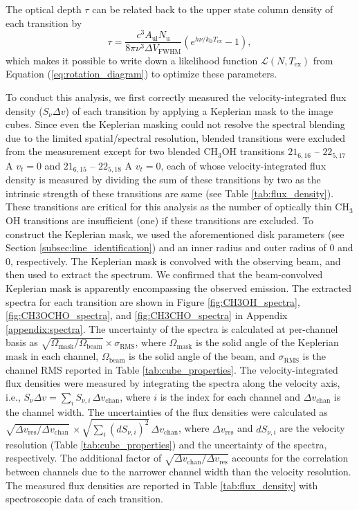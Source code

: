 \documentclass[linenumbers, twocolumn, twocolappendix, astrosymb, times]{aastex631}
\newcommand{\methanol}{CH$_3$OH\xspace}
\begin{document}
The optical depth $\tau$ can be related back to the upper state column density of each transition by 
\begin{equation}\label{eq:optical_depth}
    \tau = \frac{c^3A_\mathrm{ul}N_\mathrm{u}}{8\pi\nu^3\Delta V_\mathrm{FWHM}}\left(e^{h\nu/k_\mathrm{B}T_\mathrm{ex}} - 1\right),
\end{equation}
which makes it possible to write down a likelihood function $\mathcal{L}(N, T_\mathrm{ex})$ from Equation (\ref{eq:rotation_diagram}) to optimize these parameters. 

To conduct this analysis, we first correctly measured the velocity-integrated flux density ($S_\nu\Delta v$) of each transition by applying a Keplerian mask to the image cubes. Since even the Keplerian masking could not resolve the spectral blending due to the limited spatial/spectral resolution, blended transitions were excluded from the measurement except for two blended \methanol transitions $21_{6,16}$ -- $22_{5,17}$ A $v_t=0$ and $21_{6,15}$ -- $22_{5,18}$ A $v_t=0$, each of whose velocity-integrated flux density is measured by dividing the sum of these transitions by two as the intrinsic strength of these transitions are same (see Table \ref{tab:flux_density}). These transitions are critical for this analysis as the number of optically thin \methanol transitions are insufficient (one) if these transitions are excluded. To construct the Keplerian mask, we used the aforementioned disk parameters (see Section \ref{subsec:line_identification}) and an inner radius and outer radius of 0 and 0, respectively. The Keplerian mask is convolved with the observing beam, and then used to extract the spectrum. We confirmed that the beam-convolved Keplerian mask is apparently encompassing the observed emission. The extracted spectra for each transition are shown in Figure \ref{fig:CH3OH_spectra}, \ref{fig:CH3OCHO_spectra}, and \ref{fig:CH3CHO_spectra} in Appendix \ref{appendix:spectra}. The uncertainty of the spectra is calculated at per-channel basis as $\sqrt{\Omega_\mathrm{mask}/\Omega_\mathrm{beam}}\times\sigma_\mathrm{RMS}$, where $\Omega_\mathrm{mask}$ is the solid angle of the Keplerian mask in each channel, $\Omega_\mathrm{beam}$ is the solid angle of the beam, and $\sigma_\mathrm{RMS}$ is the channel RMS reported in Table \ref{tab:cube_properties}. The velocity-integrated flux densities were measured by integrating the spectra along the velocity axis, i.e., $S_\nu\Delta v = \sum_i S_{\nu, i}\,\Delta v_\mathrm{chan}$, where $i$ is the index for each channel and $\Delta v_\mathrm{chan}$ is the channel width. The uncertainties of the flux densities were calculated as $\sqrt{\Delta v_\mathrm{res}/\Delta v_\mathrm{chan}}\,\times\sqrt{\sum_i (dS_{\nu, i})^2}\,\Delta v_\mathrm{chan}$, where $\Delta v_\mathrm{res}$ and $dS_{\nu, i}$ are the velocity resolution (Table \ref{tab:cube_properties}) and the uncertainty of the spectra, respectively. The additional factor of $\sqrt{\Delta v_\mathrm{chan}/\Delta v_\mathrm{res}}$ accounts for the correlation between channels due to the narrower channel width than the velocity resolution. The measured flux densities are reported in Table \ref{tab:flux_density} with spectroscopic data of each transition.
\end{document}
